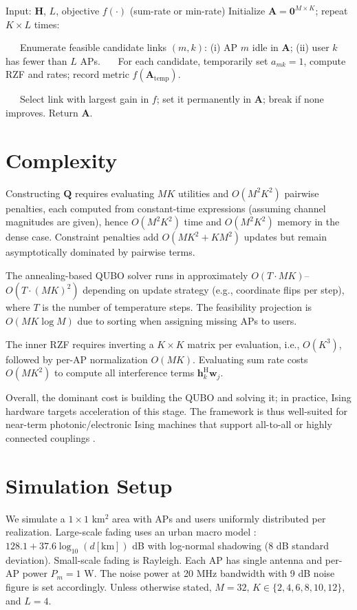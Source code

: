 \begin{algorithm}[htbp]
\caption{Greedy Sum-Rate and Greedy Max-Min (Selection Only)}
\begin{algorithmic}[1]
\State Input: $\mathbf{H}$, $L$, objective $f(\cdot)$ (sum-rate or min-rate)
\State Initialize $\mathbf{A}=\mathbf{0}^{M\times K}$; repeat $K\!\times\!L$ times:

\State ~~~Enumerate feasible candidate links $(m,k)$: (i) AP $m$ idle in $\mathbf{A}$; (ii) user $k$ has fewer than $L$ APs.
\State ~~~For each candidate, temporarily set $a_{mk}\!=\!1$, compute RZF and rates; record metric $f(\mathbf{A}_{\text{temp}})$.

\State ~~~Select link with largest gain in $f$; set it permanently in $\mathbf{A}$; break if none improves.
\State Return $\mathbf{A}$.
\end{algorithmic}
\end{algorithm}

\section{Complexity}
Constructing $\mathbf{Q}$ requires evaluating $MK$ utilities and $O(M^2K^2)$ pairwise penalties, each computed from constant-time expressions (assuming channel magnitudes are given), hence $O(M^2K^2)$ time and $O(M^2K^2)$ memory in the dense case. Constraint penalties add $O(MK^2+KM^2)$ updates but remain asymptotically dominated by pairwise terms.

The annealing-based QUBO solver runs in approximately $O(T\cdot MK)$–$O(T\cdot (MK)^2)$ depending on update strategy (e.g., coordinate flips per step), where $T$ is the number of temperature steps. The feasibility projection is $O(MK\log M)$ due to sorting when assigning missing APs to users.

The inner RZF requires inverting a $K\times K$ matrix per evaluation, i.e., $O(K^3)$, followed by per-AP normalization $O(MK)$. Evaluating sum rate costs $O(MK^2)$ to compute all interference terms $\mathbf{h}_k^\mathrm{H}\mathbf{w}_j$.

Overall, the dominant cost is building the QUBO and solving it; in practice, Ising hardware targets acceleration of this stage. The framework is thus well-suited for near-term photonic/electronic Ising machines that support all-to-all or highly connected couplings \cite{mcmahon2016fully,inagaki2016coherent}.

\section{Simulation Setup}
We simulate a $1\times 1$ km$^2$ area with APs and users uniformly distributed per realization. Large-scale fading uses an urban macro model \cite{bjornson2016massive}: $128.1+37.6\log_{10}(d[\mathrm{km}])$ dB with log-normal shadowing (8 dB standard deviation). Small-scale fading is Rayleigh. Each AP has single antenna and per-AP power $P_m=1$ W. The noise power at 20 MHz bandwidth with 9 dB noise figure is set accordingly. Unless otherwise stated, $M=32$, $K\in\{2,4,6,8,10,12\}$, and $L=4$.

